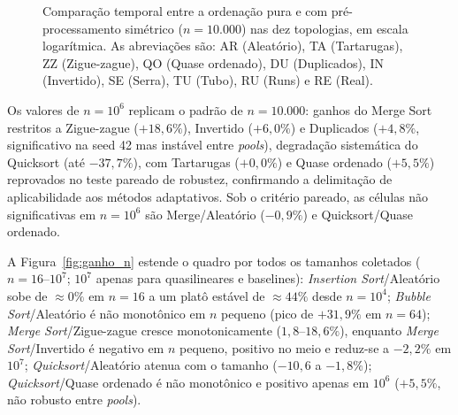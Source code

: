 \documentclass[portuguese]{sbc2025}%
\begin{document}
\begin{figure}[htbp]

\caption{Comparação temporal entre a ordenação pura e com pré-processamento
simétrico ($n=10.000$) nas dez topologias, em escala logarítmica.
As abreviações são: AR (Aleatório), TA (Tartarugas), ZZ (Zigue-zague),
QO (Quase ordenado), DU (Duplicados), IN (Invertido), SE (Serra),
TU (Tubo), RU (Runs) e RE (Real).}
\label{fig:tempos}
\end{figure}

\begin{table}[htbp]
\centering
\caption{Faixa de ganho do pré-processamento por método para vetores de $1.000.000$ de elementos (mínimo e máximo sobre as nove topologias medidas; Real excluído pelo teto do asset nativo). Os valores por célula, com marcas de significância, estão no material suplementar.}
\label{tab:tempos1M}
\small
\setlength{\tabcolsep}{2pt}
%
\end{table}

Os valores de $n{=}10^6$ replicam o padrão de $n{=}10.000$: ganhos do Merge Sort restritos a Zigue-zague ($+18{,}6\%$), Invertido ($+6{,}0\%$) e Duplicados ($+4{,}8\%$, significativo na seed 42 mas instável entre \emph{pools}), degradação sistemática do Quicksort (até $-37{,}7\%$), com Tartarugas ($+0{,}0\%$) e Quase ordenado ($+5{,}5\%$) reprovados no teste pareado de robustez, confirmando a delimitação de aplicabilidade aos métodos adaptativos. Sob o critério pareado, as células não significativas em $n{=}10^6$ são Merge/Aleatório ($-0{,}9\%$) e Quicksort/Quase ordenado.

A Figura~\ref{fig:ganho_n} estende o quadro por todos os tamanhos coletados ($n{=}16$--$10^7$; $10^7$ apenas para quasilineares e baselines): \emph{Insertion Sort}/Aleatório sobe de $\approx0\%$ em $n{=}16$ a um platô estável de $\approx44\%$ desde $n{=}10^4$; \emph{Bubble Sort}/Aleatório é não monotônico em $n$ pequeno (pico de $+31{,}9\%$ em $n{=}64$); \emph{Merge Sort}/Zigue-zague cresce monotonicamente ($1{,}8$--$18{,}6\%$), enquanto \emph{Merge Sort}/Invertido é negativo em $n$ pequeno, positivo no meio e reduz-se a $-2{,}2\%$ em $10^7$; \emph{Quicksort}/Aleatório atenua com o tamanho ($-10{,}6$ a $-1{,}8\%$); \emph{Quicksort}/Quase ordenado é não monotônico e positivo apenas em $10^6$ ($+5{,}5\%$, não robusto entre \emph{pools}).
\end{document}
